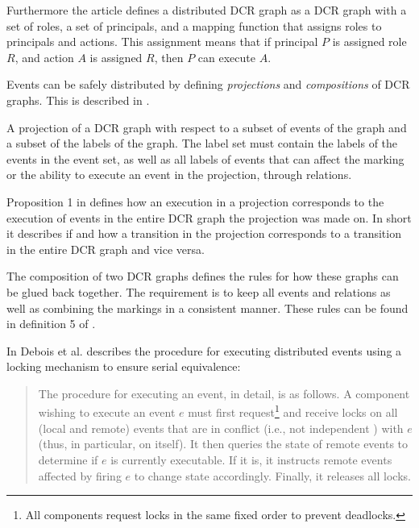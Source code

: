 	Furthermore the article defines a distributed DCR graph as a DCR graph with a set of roles, a set of principals, and a mapping function that assigns roles to principals and actions. This assignment means that if principal $P$ is assigned role $R$, and action $A$ is assigned $R$, then $P$ can execute $A$.
		
	\newpar
	Events can be safely distributed by defining \textit{projections} and \textit{compositions} of DCR graphs. This is described in \cite{hildebrandt2011safe}.
	
	\newpar
	A projection of a DCR graph with respect to a subset of events of the graph and a subset of the labels of the graph. The label set must contain the labels of the events in the event set, as well as all labels of events that can affect the marking or the ability to execute an event in the projection, through relations.
	
	\newpar
	Proposition 1 in \cite{hildebrandt2011safe} defines how an execution in a projection corresponds to the execution of events in the entire DCR graph the projection was made on. In short it describes if and how a transition in the projection corresponds to a transition in the entire DCR graph and vice versa.
	
	\newpar
	The composition of two DCR graphs defines the rules for how these graphs can be glued back together. The requirement is to keep all events and relations as well as combining the markings in a consistent manner. These rules can be found in definition 5 of \cite{hildebrandt2011safe}.
    
	\newpar 
	In \cite{debois2015concurrency} Debois et al. describes the procedure for executing distributed events using a locking mechanism to ensure serial equivalence:
	
	\begin{quotation}
		The procedure for executing an event, in detail, is as follows. A component
		wishing to execute an event $e$ must first request\footnote{All components request locks in the same fixed order to prevent deadlocks.} and receive locks on all (local
		and remote) events that are in conflict (i.e., not independent ) with $e$ (thus, in
		particular, on itself). It then queries the state of remote events to determine if
		$e$ is currently executable. If it is, it instructs remote events affected by firing $e$
		to change state accordingly. Finally, it releases all locks.
	\end{quotation}

